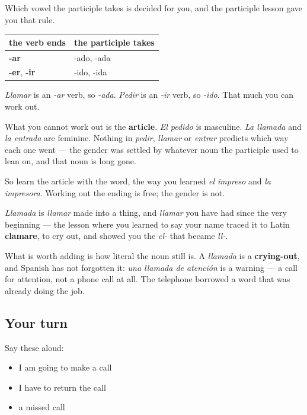 \begin{grammarlens}[title={Grammar Lens: the vowel is a rule, the gender is not}]
Which vowel the participle takes is decided for you, and the participle lesson gave you that rule.

\noindent
\begin{tabularx}{\linewidth}{@{}>{\raggedright\arraybackslash}X>{\raggedright\arraybackslash}X@{}}
\toprule
\textbf{the verb ends} & \textbf{the participle takes} \\
\midrule
\textbf{-ar} & -ado, -ada \\
\textbf{-er}, \textbf{-ir} & -ido, -ida \\
\bottomrule
\end{tabularx}

\emph{Llamar} is an \emph{-ar} verb, so \emph{-ada}. \emph{Pedir} is an \emph{-ir} verb, so \emph{-ido}. That much you can work out.

What you cannot work out is the \textbf{article}. \emph{El pedido} is masculine. \emph{La llamada} and \emph{la entrada} are feminine. Nothing in \emph{pedir}, \emph{llamar} or \emph{entrar} predicts which way each one went — the gender was settled by whatever noun the participle used to lean on, and that noun is long gone.

So learn the article with the word, the way you learned \emph{el impreso} and \emph{la impresora}. Working out the ending is free; the gender is not.
\end{grammarlens}

\begin{cousinweb}
\emph{Llamada} is \emph{llamar} made into a thing, and \emph{llamar} you have had since the very beginning — the lesson where you learned to say your name traced it to Latin \textbf{clamare}, to cry out, and showed you the \emph{cl-} that became \emph{ll-}.

What is worth adding is how literal the noun still is. A \emph{llamada} is a \textbf{crying-out}, and Spanish has not forgotten it: \emph{una llamada de atención} is a warning — a call for attention, not a phone call at all. The telephone borrowed a word that was already doing the job.
\end{cousinweb}

\subsection*{Your turn}
Say these aloud:

\begin{itemize}
\raggedright
  \item I am going to make a call
  \item I have to return the call
  \item a missed call
\end{itemize}

